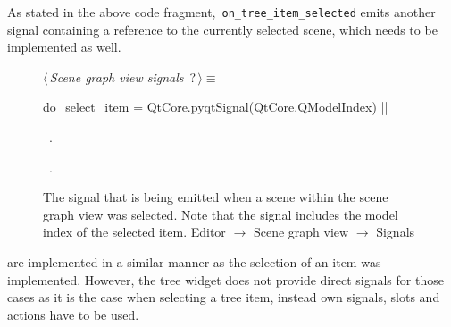 \documentclass[%
    a4paper,    %
    justified,  %
    nobib,      %
    openany     %
]{tufte-book}
\makeatletter
\renewcommand{\label}[1]{\@tufte@label{##1}}%
\makeatother
\begin{document}
As stated in the above code fragment,~\verb=on_tree_item_selected= emits another
signal containing a reference to the currently selected scene, which needs to be
implemented as well.

\begin{figure}
\begin{flushleft} \small
\begin{minipage}{\linewidth}\label{scrap45}\raggedright\small
{} $\langle\,${\itshape Scene graph view signals}\nobreak\ {\footnotesize {?}}$\,\rangle\equiv$
\vspace{-1ex}
\begin{pythoncode}
do_select_item = QtCore.pyqtSignal(QtCore.QModelIndex)
|\NWsep|
\end{pythoncode}
\vspace{1.5ex}
\footnotesize
\begin{list}{}{\setlength{\itemsep}{-\parsep}\setlength{\itemindent}{-\leftmargin}}
\item \NWtxtMacroDefBy\ .
\item \NWtxtMacroRefIn\ .

\item{}
\end{list}
\end{minipage}\vspace{4ex}
\end{flushleft}
\caption{The signal that is being emitted when a scene within the scene graph
view was selected. Note that the signal includes the model index of the selected
item.
  \newline{}\newline{}Editor $\rightarrow$ Scene graph view
  $\rightarrow$ Signals}
\label{editor:lst:scene-graph-view:signals:do-select-item}
\end{figure}

 are implemented in a similar manner
as the selection of an item was implemented. However, the tree widget does not
provide direct signals for those cases as it is the case when selecting a tree
item, instead own signals, slots and actions have to be used.
\end{document}
